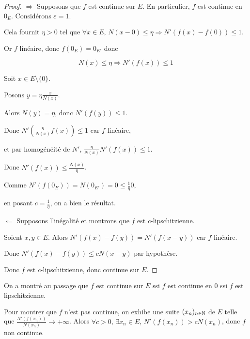 
\begin{proof} 
    $\Rightarrow$ Supposons que $f$ est continue sur $E$. En particulier, $f$ est 
    continue en $0_E$. Considérons $\varepsilon = 1$.

    Cela fournit $\eta > 0$ tel que $\forall x \in E, \, N(x - 0) \leqslant \eta \Rightarrow N'(f(x) - f(0)) \leqslant 1$.

    Or $f$ linéaire, donc $f(0_E) = 0_{E'}$ donc 
    
    $$N(x) \leqslant \eta \Rightarrow N'(f(x)) \leqslant 1$$

    Soit $x \in E \setminus \{0\}$. 
    
    Posons $\displaystyle y = \eta \frac {x}{N(x)} $.

    Alors $N(y) = \eta$, donc $N'(f(y)) \leqslant 1$.

    Donc $N'\left( \frac{\eta }{N(x)} f(x) \right) \leqslant 1$ car $f$ linéaire, 
    
    et par homogénéité de $N'$, $ \frac{\eta }{N(x)} N'(f(x)) \leqslant 1$.

    Donc $N'(f(x)) \leqslant \frac{N(x)}{\eta}$.

    Comme $N'(f(0_E)) = N(0_{E'}) = 0 \leqslant \frac 1 \eta 0 $, 
    
    en posant $c = \frac 1 \eta$, on a bien le résultat. 

    \lvspace $\Leftarrow$ Supposons l'inégalité et montrons que $f$ est $c$-lipschitzienne. 

    Soient $x, y \in E$. Alors $N'(f(x) - f(y)) = N'(f(x - y)) $ car $f$ linéaire.

    Donc $N'(f(x) - f(y)) \leqslant c N(x - y)$ par hypothèse. 

    Donc $f$ est $c$-lipschitzienne, donc continue sur $E$.
\end{proof}

\begin{remarque}
    On a montré au passage que $f$ est continue sur $E$ ssi $f$ est continue en $0$ ssi $f$ est lipschitzienne.  

    Pour montrer que $f$ n'est pas continue, on exhibe une suite $(x_n)_{n \in \mathbb{N}}$ de $E$ 
    telle que $\displaystyle \frac{N'(f(x_n))}{N(x_n)} \to + \infty$. Alors $\forall c > 0, \, \exists x_n \in E, \, N'(f(x_n)) > c N(x_n)$, 
    donc $f$ non continue.
\end{remarque}

